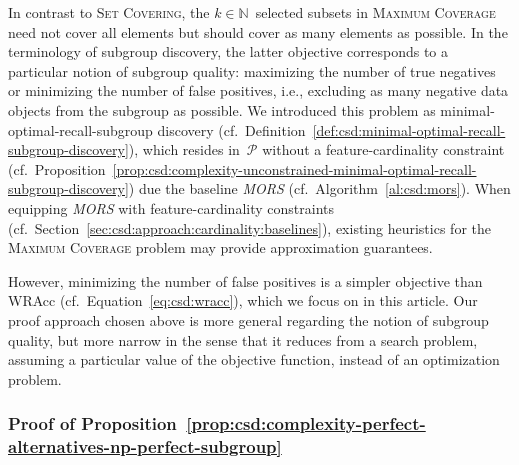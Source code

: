 \documentclass{article}
\theoremstyle{definition}
\begin{document}
In contrast to \textsc{Set Covering}, the $k \in \mathbb{N}$~selected subsets in \textsc{Maximum Coverage} need not cover all elements but should cover as many elements as possible.
In the terminology of subgroup discovery, the latter objective corresponds to a particular notion of subgroup quality:
maximizing the number of true negatives or minimizing the number of false positives, i.e., excluding as many negative data objects from the subgroup as possible.
We introduced this problem as minimal-optimal-recall-subgroup discovery (cf.~Definition~\ref{def:csd:minimal-optimal-recall-subgroup-discovery}), which resides in~$\mathcal{P}$ without a feature-cardinality constraint (cf.~Proposition~\ref{prop:csd:complexity-unconstrained-minimal-optimal-recall-subgroup-discovery}) due the baseline \emph{MORS} (cf.~Algorithm~\ref{al:csd:mors}).
When equipping \emph{MORS} with feature-cardinality constraints (cf.~Section~\ref{sec:csd:approach:cardinality:baselines}), existing heuristics for the \textsc{Maximum Coverage} problem may provide approximation guarantees.

However, minimizing the number of false positives is a simpler objective than WRAcc (cf.~Equation~\ref{eq:csd:wracc}), which we focus on in this article.
Our proof approach chosen above is more general regarding the notion of subgroup quality, but more narrow in the sense that it reduces from a search problem, assuming a particular value of the objective function, instead of an optimization problem.

\subsubsection{Proof of Proposition~\ref{prop:csd:complexity-perfect-alternatives-np-perfect-subgroup}}
\label{sec:csd:appendix:proofs:complexity-perfect-alternatives-np-perfect-subgroup}
\end{document}
